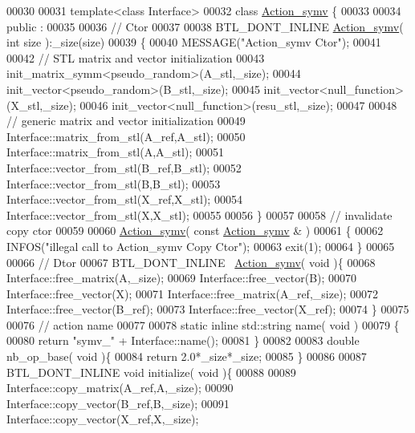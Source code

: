 \begin{DoxyCode}
00030 
00031 \textcolor{keyword}{template}<\textcolor{keyword}{class} Interface>
00032 \textcolor{keyword}{class }\hyperlink{class_action__symv}{Action\_symv} \{
00033 
00034 public :
00035 
00036   \textcolor{comment}{// Ctor}
00037 
00038   BTL\_DONT\_INLINE \hyperlink{class_action__symv}{Action\_symv}( \textcolor{keywordtype}{int} size ):\_size(size)
00039   \{
00040     MESSAGE(\textcolor{stringliteral}{"Action\_symv Ctor"});
00041 
00042     \textcolor{comment}{// STL matrix and vector initialization}
00043     init\_matrix\_symm<pseudo\_random>(A\_stl,\_size);
00044     init\_vector<pseudo\_random>(B\_stl,\_size);
00045     init\_vector<null\_function>(X\_stl,\_size);
00046     init\_vector<null\_function>(resu\_stl,\_size);
00047 
00048     \textcolor{comment}{// generic matrix and vector initialization}
00049     Interface::matrix\_from\_stl(A\_ref,A\_stl);
00050     Interface::matrix\_from\_stl(A,A\_stl);
00051     Interface::vector\_from\_stl(B\_ref,B\_stl);
00052     Interface::vector\_from\_stl(B,B\_stl);
00053     Interface::vector\_from\_stl(X\_ref,X\_stl);
00054     Interface::vector\_from\_stl(X,X\_stl);
00055 
00056   \}
00057 
00058   \textcolor{comment}{// invalidate copy ctor}
00059 
00060   \hyperlink{class_action__symv}{Action\_symv}( \textcolor{keyword}{const}  \hyperlink{class_action__symv}{Action\_symv} & )
00061   \{
00062     INFOS(\textcolor{stringliteral}{"illegal call to Action\_symv Copy Ctor"});
00063     exit(1);
00064   \}
00065 
00066   \textcolor{comment}{// Dtor}
00067   BTL\_DONT\_INLINE ~\hyperlink{class_action__symv}{Action\_symv}( \textcolor{keywordtype}{void} )\{
00068     Interface::free\_matrix(A,\_size);
00069     Interface::free\_vector(B);
00070     Interface::free\_vector(X);
00071     Interface::free\_matrix(A\_ref,\_size);
00072     Interface::free\_vector(B\_ref);
00073     Interface::free\_vector(X\_ref);
00074   \}
00075 
00076   \textcolor{comment}{// action name}
00077 
00078   \textcolor{keyword}{static} \textcolor{keyword}{inline} std::string name( \textcolor{keywordtype}{void} )
00079   \{
00080     \textcolor{keywordflow}{return} \textcolor{stringliteral}{"symv\_"} + Interface::name();
00081   \}
00082 
00083   \textcolor{keywordtype}{double} nb\_op\_base( \textcolor{keywordtype}{void} )\{
00084     \textcolor{keywordflow}{return} 2.0*\_size*\_size;
00085   \}
00086 
00087   BTL\_DONT\_INLINE  \textcolor{keywordtype}{void} initialize( \textcolor{keywordtype}{void} )\{
00088 
00089     Interface::copy\_matrix(A\_ref,A,\_size);
00090     Interface::copy\_vector(B\_ref,B,\_size);
00091     Interface::copy\_vector(X\_ref,X,\_size);

\end{DoxyCode}
